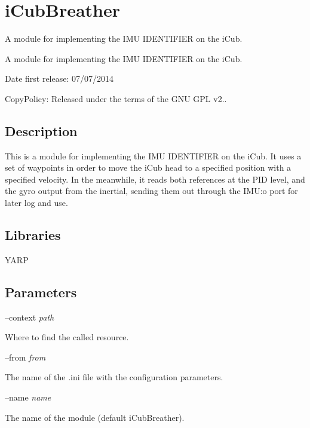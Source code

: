 \section{i\+Cub\+Breather}
\label{group__icub__iCubBreather}


A module for implementing the I\+MU I\+D\+E\+N\+T\+I\+F\+I\+ER on the i\+Cub.  


A module for implementing the I\+MU I\+D\+E\+N\+T\+I\+F\+I\+ER on the i\+Cub. 

Date first release\+: 07/07/2014

Copy\+Policy\+: Released under the terms of the G\+NU G\+PL v2..\hypertarget{group__icub__iCubWriter_intro_sec}{}\subsection{Description}\label{group__icub__iCubWriter_intro_sec}
This is a module for implementing the I\+MU I\+D\+E\+N\+T\+I\+F\+I\+ER on the i\+Cub. It uses a set of waypoints in order to move the i\+Cub head to a specified position with a specified velocity. In the meanwhile, it reads both references at the P\+ID level, and the gyro output from the inertial, sending them out through the I\+MU\+:o port for later log and use.\hypertarget{group__icub__iCubWriter_lib_sec}{}\subsection{Libraries}\label{group__icub__iCubWriter_lib_sec}
Y\+A\+RP\hypertarget{group__icub__iCubWriter_parameters_sec}{}\subsection{Parameters}\label{group__icub__iCubWriter_parameters_sec}
--context {\itshape path} 
\begin{DoxyItemize}
\item Where to find the called resource.
\end{DoxyItemize}

--from {\itshape from} 
\begin{DoxyItemize}
\item The name of the .ini file with the configuration parameters.
\end{DoxyItemize}

--name {\itshape name} 
\begin{DoxyItemize}
\item The name of the module (default i\+Cub\+Breather).
\end{DoxyItemize}

